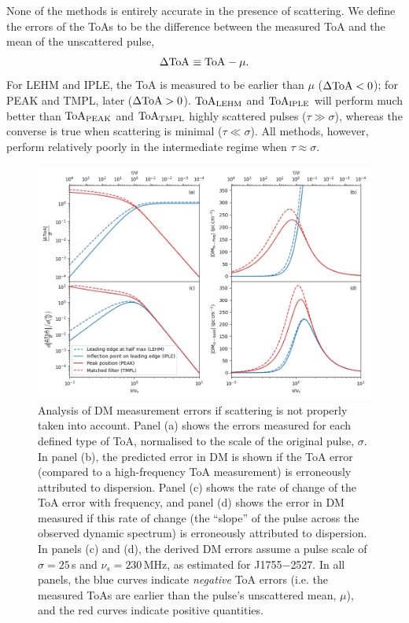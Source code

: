 \documentclass[preprint2,linenumbers]{aastex631}
\newcommand{\src}{J1755$-$2527}
\newcommand{\ToA}[1]{{\rm ToA}_{\rm {#1}}}
\begin{document}
None of the methods is entirely accurate in the presence of scattering.
We define the errors of the ToAs to be the difference between the measured ToA and the mean of the unscattered pulse,
\begin{equation}
    \Delta \ToA{} \equiv \ToA{} - \mu.
\end{equation}
For LEHM and IPLE, the ToA is measured to be earlier than $\mu$ ($\Delta{\rm ToA} < 0$); for PEAK and TMPL, later ($\Delta{\rm ToA} > 0$).
$\ToA{LEHM}$ and $\ToA{IPLE}$ will perform much better than $\ToA{PEAK}$ and $\ToA{TMPL}$ highly scattered pulses ($\tau \gg \sigma$), whereas the converse is true when scattering is minimal ($\tau \ll \sigma$).
All methods, however, perform relatively poorly in the intermediate regime when $\tau \approx \sigma$.

\begin{figure}[th]
    \centering
    \includegraphics[width=0.98\linewidth]{scattering_DM.png}
    \caption{Analysis of DM measurement errors if scattering is not properly taken into account. Panel (a) shows the errors measured for each defined type of ToA, normalised to the scale of the original pulse, $\sigma$. In panel (b), the predicted error in DM is shown if the ToA error (compared to a high-frequency ToA measurement) is erroneously attributed to dispersion. Panel (c) shows the rate of change of the ToA error with frequency, and panel (d) shows the error in DM measured if this rate of change (the ``slope'' of the pulse across the observed dynamic spectrum) is erroneously attributed to dispersion. In panels (c) and (d), the derived DM errors assume a pulse scale of $\sigma = 25\,$s and $\nu_s = 230\,$MHz, as estimated for \src{}. In all panels, the blue curves indicate \emph{negative} ToA errors (i.e. the measured ToAs are earlier than the pulse's unscattered mean, $\mu$), and the red curves indicate positive quantities.}
    \label{fig:scattering_DM}
\end{figure}
\end{document}
